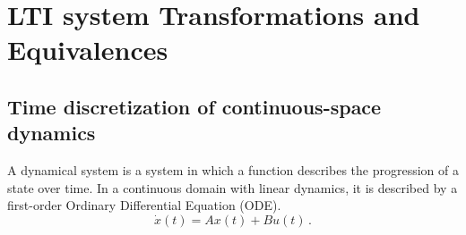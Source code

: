 \documentclass[runningheads,a4paper]{llncs}
\begin{document}
\section{LTI system Transformations and Equivalences} \label{sec:appendix:LTIbackground}

\subsection{Time discretization of continuous-space dynamics}

A dynamical system is a system in which a function describes the progression
of a state over time.  In a continuous domain with linear dynamics, it is
described by a first-order Ordinary Differential Equation (ODE).
%
\begin{equation}
\dot{x}(t)=Ax(t)+Bu(t) \,.
\label{eq:dynamical}
\end{equation}
\end{document}
